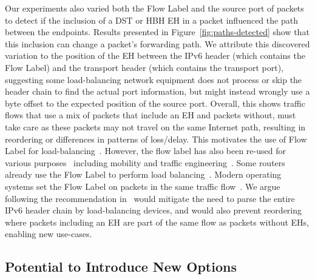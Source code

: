 \documentclass[conference]{IEEEtran}
\begin{document}

Our experiments also varied both the Flow Label and the source port of packets to detect if the inclusion of a DST or HBH EH in a packet influenced the path between the endpoints. Results presented in Figure~\ref{fig:paths-detected} show that this inclusion can change a packet's forwarding path. We attribute this discovered variation to the position of the EH between the IPv6 header (which contains the Flow Label) and the transport header (which contains the transport port), suggesting some load-balancing network equipment does not process or skip the header chain to find the actual port information, but might instead wrongly use a byte offset to the expected position of the source port. Overall, this shows traffic flows that use a mix of packets that include an EH and packets without, must take care as these packets may not travel on the same Internet path, resulting in reordering or differences in patterns of loss/delay. 
This motivates the use of Flow Label for load-balancing~\cite{RFC6437}. However,  the flow label has also been re-used for various purposes~\cite{flow-label-approaches} including mobility and traffic engineering~\cite{traffic-eng}. Some routers already use the Flow Label to perform load balancing~\cite{lb-classification}. Modern operating systems set the Flow Label on packets in the same traffic flow~\cite{os-fl}. We argue following the recommendation in~\cite{RFC6437} would mitigate the need to parse the entire IPv6 header chain by load-balancing devices, and would also prevent reordering where packets including an EH are part of the same flow as packets without EHs, enabling new use-cases. 




\subsection{Potential to Introduce New Options}
\end{document}
